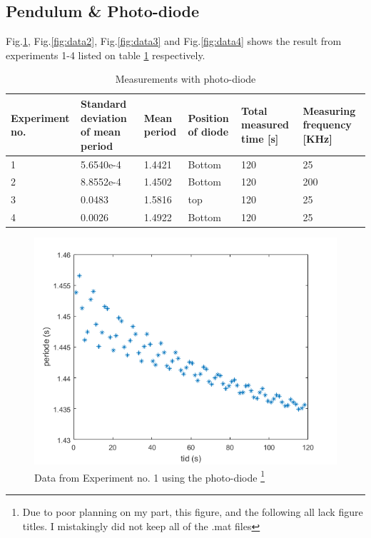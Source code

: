 \documentclass[%
 reprint,
 amsmath,amssymb,
 aps,
]{revtex4-1}
\begin{document}
    \subsection{Pendulum \& Photo-diode}

    Fig.\ref{fig:data1}, Fig.\ref{fig:data2}, Fig.\ref{fig:data3} and Fig.\ref{fig:data4} shows the result from experiments 1-4 listed on table \ref{tab:photodiode} respectively.

    \begin{table}[h] %
        \caption{Measurements with photo-diode}
        \label{tab:photodiode}
        \begin{tabular}{| p{1.6cm} | p{1.4cm} | p{1.1cm} | p{1.3cm} | p{1.3cm} | p{1.5cm} |}
            \hline
            Experiment no. & Standard deviation of mean period & Mean period & Position of diode & Total measured time [s] & Measuring frequency [KHz] \\ \hline
            1 & 5.6540e-4 & 1.4421 & Bottom & 120 & 25 \\ \hline
            2 & 8.8552e-4 & 1.4502 & Bottom & 120 & 200 \\ \hline
            3 & 0.0483 & 1.5816 & top & 120 & 25 \\ \hline
            4 & 0.0026 & 1.4922 & Bottom & 120 & 25 \\ \hline
        \end{tabular}
    \end{table}
    
    \begin{figure}[h!]
    	\center
    	\includegraphics[scale=0.6]{forsok1fig1}
    	\caption{Data from Experiment no. 1 using the photo-diode
    	\footnote{Due to poor planning on my part, this figure, and the following all lack figure titles. I mistakingly did not keep all of the .mat files
    	}}
        \label{fig:data1}
    \end{figure}
\end{document}
